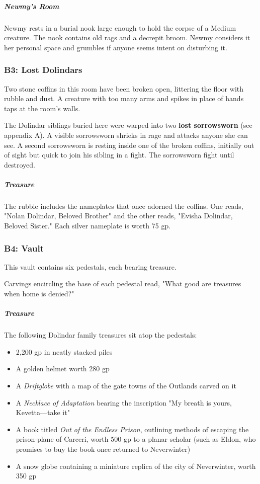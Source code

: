 \documentclass[10pt,a4paper,twoside,bg=print,twocolumn,openany,nodeprecatedcode]{dndbook}
\begin{document}
\subparagraph{Newmy's Room}
Newmy rests in a burial nook large enough to hold the corpse of a Medium creature. The nook contains old rags and a decrepit broom. Newmy considers it her personal space and grumbles if anyone seems intent on disturbing it.

\subsubsection{B3: Lost Dolindars}
\begin{DndReadAloud}{}
Two stone coffins in this room have been broken open, littering the floor with rubble and dust. A creature with too many arms and spikes in place of hands taps at the room's walls.

\end{DndReadAloud}

The Dolindar siblings buried here were warped into two \textbf{lost sorrowsworn} (see appendix A). A visible sorrowsworn shrieks in rage and attacks anyone she can see. A second sorrowsworn is resting inside one of the broken coffins, initially out of sight but quick to join his sibling in a fight. The sorrowsworn fight until destroyed.

\subparagraph{Treasure}
The rubble includes the nameplates that once adorned the coffins. One reads, "Nolan Dolindar, Beloved Brother" and the other reads, "Evisha Dolindar, Beloved Sister." Each silver nameplate is worth 75 gp.

\subsubsection{B4: Vault}
\begin{DndReadAloud}{}
This vault contains six pedestals, each bearing treasure.

\end{DndReadAloud}

Carvings encircling the base of each pedestal read, "What good are treasures when home is denied?"

\subparagraph{Treasure}
The following Dolindar family treasures sit atop the pedestals:


\begin{itemize}
\item 2,200 gp in neatly stacked piles
\item A golden helmet worth 280 gp
\item A \textit{Driftglobe} with a map of the gate towns of the Outlands carved on it
\item A \textit{Necklace of Adaptation} bearing the inscription "My breath is yours, Kevetta—take it"
\item A book titled \textit{Out of the Endless Prison}, outlining methods of escaping the prison-plane of Carceri, worth 500 gp to a planar scholar (such as Eldon, who promises to buy the book once returned to Neverwinter)
\item A snow globe containing a miniature replica of the city of Neverwinter, worth 350 gp
\end{itemize}
\end{document}
